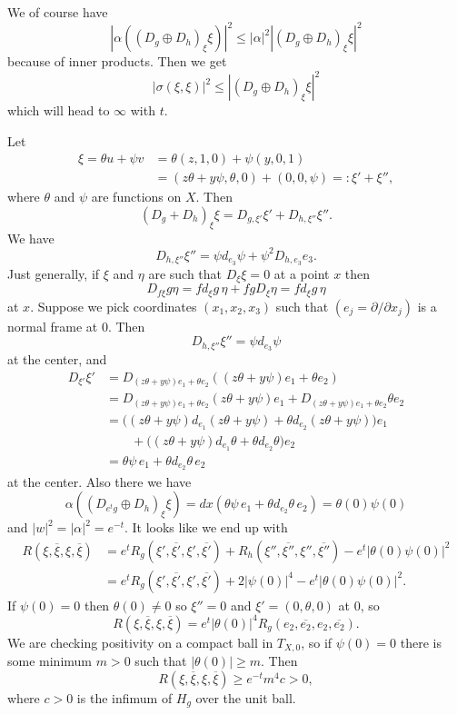 \documentclass[11pt]{amsart}
\theoremstyle{definition}
\def\ov#1{\overline{#1}}
\begin{document}
We of course have
$$
|\alpha((D_g \oplus D_h)_\xi \xi)|^2
\leq |\alpha|^2 |(D_g \oplus D_h)_\xi \xi|^2
$$
because of inner products.
Then we get
$$
|\sigma(\xi, \xi)|^2
\leq |(D_g \oplus D_h)_\xi \xi|^2
$$
which will head to $\infty$ with $t$.

Let
\begin{align*}
\xi = \theta u + \psi v
&= \theta (z, 1, 0) + \psi (y, 0, 1)
\\
&= (z \theta + y \psi, \theta, 0) + (0, 0, \psi)
=: \xi' + \xi'',
\end{align*}
where $\theta$ and $\psi$ are functions on $X$.
Then
$$
(D_g + D_h)_\xi \xi
= D_{g,\xi'}\xi' + D_{h,\xi''} \xi''.
$$
We have
$$
D_{h,\xi''} \xi''
= \psi d_{e_3} \psi + \psi^2 D_{h,e_3} e_3.
$$
Just generally, if $\xi$ and $\eta$ are such that $D_\xi \xi = 0$ at a point $x$
then
$$
D_{f \xi} g \eta = f d_\xi g \, \eta + fg D_\xi \eta = f d_\xi g \, \eta
$$
at $x$.
Suppose we pick coordinates $(x_1,x_2,x_3)$ such that $(e_j = \partial
/ \partial x_j)$ is a normal frame at $0$. Then
$$
D_{h,\xi''} \xi''
= \psi d_{e_3} \psi
$$
at the center, and
\begin{align*}
D_{\xi'} \xi'
&= D_{(z\theta + y\psi)e_1 + \theta e_2}((z\theta + y\psi)e_1 + \theta e_2)
\\
&= D_{(z\theta + y\psi)e_1 + \theta e_2}(z\theta + y\psi)e_1
+ D_{(z\theta + y\psi)e_1 + \theta e_2}\theta e_2
\\
&= \bigl(
(z\theta + y\psi)d_{e_1}(z\theta + y\psi)
+ \theta d_{e_2}(z\theta + y\psi)
\bigr) e_1
\\
&\qquad
+ \bigl(
(z\theta + y\psi)d_{e_1}\theta
+ \theta d_{e_2}\theta
\bigr) e_2
\\
&=
\theta \psi \, e_1
+ \theta d_{e_2}\theta
\, e_2
\end{align*}
at the center.
Also there we have
$$
\alpha((D_{e^t g} \oplus D_h)_\xi \xi)
= dx(\theta \psi \, e_1
+ \theta d_{e_2}\theta
\, e_2)
= \theta(0) \psi(0)
$$
and $|w|^2 = |\alpha|^2 = e^{-t}$.
It looks like we end up with
\begin{align*}
R(\xi, \ov\xi, \xi, \ov\xi)
&= e^t R_g(\xi', \ov{\xi'}, \xi', \ov{\xi'})
+ R_h(\xi'', \ov{\xi''}, \xi'', \ov{\xi''})
- e^t |\theta(0) \psi(0)|^2
\\
&= e^t R_g(\xi', \ov{\xi'}, \xi', \ov{\xi'})
+ 2 |\psi(0)|^4
- e^t |\theta(0) \psi(0)|^2.
\end{align*}
If $\psi(0) = 0$ then $\theta(0) \not= 0$
so $\xi'' = 0$ and $\xi' = (0, \theta, 0)$ at $0$, so
$$
R(\xi, \ov\xi, \xi, \ov\xi)
= e^t |\theta(0)|^4 R_g(e_2, \ov{e_2}, e_2, \ov{e_2}).
$$
We are checking positivity on a compact ball in $T_{X,0}$, so if $\psi(0) = 0$
there is some minimum $m > 0$ such that $|\theta(0)| \geq m$. Then
$$
R(\xi, \ov\xi, \xi, \ov\xi)
\geq e^{-t} m^4 c > 0,
$$
where $c > 0$ is the infimum of $H_g$ over the unit ball.
\end{document}
